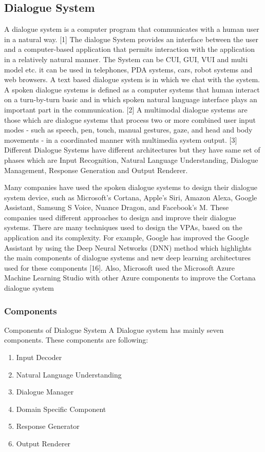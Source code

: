 \documentclass[12pt,a4paper]{article}
\begin{document}
\begin{center}
\section{Dialogue System}
\end{center}

A dialogue system is a computer program
that communicates with a human user in a natural
way. [1] The dialogue System provides an interface
between the user and a computer-based application
that permits interaction with the application in a
relatively natural manner. The System can be CUI,
GUI, VUI and multi model etc. it can be used in
telephones, PDA systems, cars, robot systems and
web browsers. A text based dialogue system is in
which we chat with the system. A spoken dialogue
systems is defined as a computer systems that human
interact on a turn-by-turn basic and in which spoken
natural language interface plays an important part in
the communication. [2] A multimodal dialogue
systems are those which are dialogue systems that
process two or more combined user input modes -
such as speech, pen, touch, manual gestures, gaze,
and head and body movements - in a coordinated
manner with multimedia system output. [3] Different
Dialogue Systems have different architectures but
they have same set of phases which are Input
Recognition, Natural Language Understanding,
Dialogue Management, Response Generation and
Output Renderer.
\par 
Many companies have used the spoken dialogue systems to
design their dialogue system device, such as Microsoft’s
Cortana, Apple’s Siri, Amazon Alexa, Google Assistant,
Samsung S Voice, Nuance Dragon, and Facebook’s M. These
companies used different approaches to design and improve
their dialogue systems. There are many techniques used to
design the VPAs, based on the application and its complexity.
For example, Google has improved the Google Assistant by
using the Deep Neural Networks (DNN) method which
highlights the main components of dialogue systems and new
deep learning architectures used for these components [16].
Also, Microsoft used the Microsoft Azure Machine Learning
Studio with other Azure components to improve the Cortana
dialogue system

\subsubsection{Components}
Components of Dialogue System
A Dialogue system has mainly seven
components. These components are following:
\begin{enumerate}
\item Input Decoder
\item Natural Language Understanding
\item Dialogue Manager
\item Domain Specific Component
\item Response Generator
\item Output Renderer
\end{enumerate}
\end{document}
